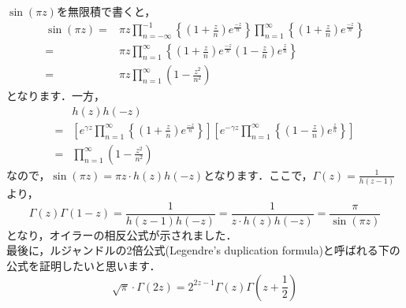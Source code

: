 \documentclass[./main]{subfile}
\begin{document}
$\sin(\pi z)$を無限積で書くと，
\begin{align*}
\sin(\pi z)=&\pi z\prod_{n=-\infty}^{-1}\left\{\left(1+\frac{z}{n}\right)e^{\frac{-z}{n}}\right\}\prod_{n=1}^{\infty}\left\{\left(1+\frac{z}{n}\right)e^{\frac{-z}{n}}\right\}\\
=&\pi z\prod_{n=1}^{\infty}\left\{\left(1+\frac{z}{n}\right)e^{\frac{-z}{n}}\left(1-\frac{z}{n}\right)e^{\frac{z}{n}}\right\}\\
=&\pi z\prod_{n=1}^{\infty}\left(1-\frac{z^2}{n^2}\right)
\end{align*}
となります．一方，
\begin{align*}
&h(z)h(-z)\\
=&\left[e^{\gamma z}\prod_{n=1}^{\infty}\left\{\left(1+\frac{z}{n}\right)e^{\frac{-z}{n}}\right\}\right]\left[e^{-\gamma z}\prod_{n=1}^{\infty}\left\{\left(1-\frac{z}{n}\right)e^{\frac{z}{n}}\right\}\right]\\
=&\prod_{n=1}^{\infty}\left(1-\frac{z^2}{n^2}\right)
\end{align*}
なので，$\sin(\pi z)=\pi z\cdot h(z)h(-z)$となります．ここで，$\Gamma(z)=\frac{1}{h(z-1)}$より，
\[
\Gamma(z)\Gamma(1-z)=\frac{1}{h(z-1)h(-z)}=\frac{1}{z\cdot h(z)h(-z)}=\frac{\pi}{\sin(\pi z)}
\]
となり，オイラーの相反公式が示されました．
\vspace{\baselineskip}\\

最後に，ルジャンドルの2倍公式(Legendre's duplication formula)と呼ばれる下の公式を証明したいと思います．
\begin{equation}\label{LDF}
\sqrt{\pi}\cdot\Gamma(2z)=2^{2z-1}\Gamma(z)\Gamma\left(z+\frac{1}{2}\right)
\end{equation}
\end{document}
